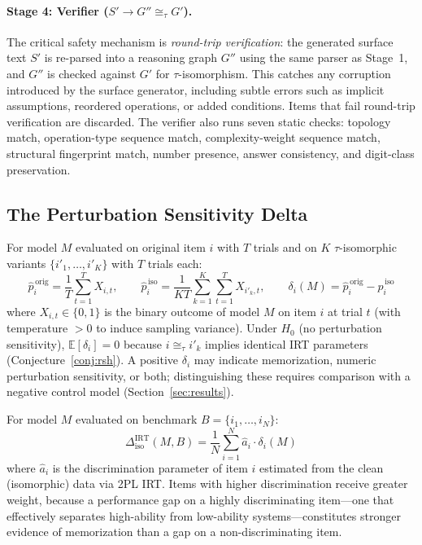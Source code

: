 \paragraph{Stage 4: Verifier ($S' \to G'' \cong_\tau G'$).}
The critical safety mechanism is \emph{round-trip verification}: the
generated surface text $S'$ is re-parsed into a reasoning graph $G''$
using the same parser as Stage~1, and $G''$ is checked against $G'$ for
$\tau$-isomorphism. This catches any corruption introduced by the
surface generator, including subtle errors such as implicit assumptions,
reordered operations, or added conditions. Items that fail round-trip
verification are discarded. The verifier also runs seven static checks:
topology match, operation-type sequence match, complexity-weight
sequence match, structural fingerprint match, number presence, answer
consistency, and digit-class preservation.


\subsection{The Perturbation Sensitivity Delta}
\label{sec:delta}

\begin{definition}
\label{def:item_delta}
For model $M$ evaluated on original item $i$ with $T$ trials and on $K$
$\tau$-isomorphic variants $\{i'_1, \ldots, i'_K\}$ with $T$ trials
each:
\begin{equation}
\hat{p}_i^{\,\mathrm{orig}} = \frac{1}{T} \sum_{t=1}^{T} X_{i,t},
\qquad
\hat{p}_i^{\,\mathrm{iso}} = \frac{1}{KT} \sum_{k=1}^{K}
\sum_{t=1}^{T} X_{i'_k, t},
\qquad
\delta_i(M) = \hat{p}_i^{\,\mathrm{orig}} -
\hat{p}_i^{\,\mathrm{iso}}
\label{eq:item_delta}
\end{equation}
where $X_{i,t} \in \{0,1\}$ is the binary outcome of model $M$ on item
$i$ at trial $t$ (with temperature $> 0$ to induce sampling variance).
Under $H_0$ (no perturbation sensitivity), $\mathbb{E}[\delta_i] = 0$ because
$i \cong_\tau i'_k$ implies identical IRT parameters (Conjecture~\ref{conj:rsh}).
A positive $\delta_i$ may indicate memorization, numeric perturbation
sensitivity, or both; distinguishing these requires comparison with a
negative control model (Section~\ref{sec:results}).
\end{definition}

\begin{definition}
\label{def:model_delta}
For model $M$ evaluated on benchmark $B = \{i_1, \ldots, i_N\}$:
\begin{equation}
\Delta_{\mathrm{iso}}^{\mathrm{IRT}}(M, B) = \frac{1}{N}
\sum_{i=1}^{N} \hat{a}_i \cdot \delta_i(M)
\label{eq:delta_irt}
\end{equation}
where $\hat{a}_i$ is the discrimination parameter of item $i$ estimated
from the clean (isomorphic) data via 2PL IRT. Items with higher
discrimination receive greater weight, because a performance gap on a
highly discriminating item---one that effectively separates high-ability
from low-ability systems---constitutes stronger evidence of memorization
than a gap on a non-discriminating item.
\end{definition}


